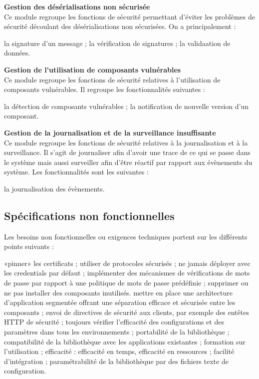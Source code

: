 \textbf{\RIGHTarrow Gestion des désérialisations non sécurisée}\\
Ce module regroupe les fonctions de sécurité permettant d'éviter les problèmes de sécurité découlant des désérialisations non sécurisées. On a principalement :
\begin{itemize}
	\itemcheck la signature d'un message ;
	\itemcheck la vérification de signatures ; 
	\itemcheck la validaation de données.\\
\end{itemize}

\textbf{\RIGHTarrow Gestion de l'utilisation de composants vulnérables}\\
Ce module regroupe les fonctions de sécurité relatives à l'utilisation de composants vulnérables. Il regroupe les fonctionnalités suivantes :
\begin{itemize}
	\itemcheck la détection de composants vulnérables ;
	\itemcheck la notification de nouvelle version d'un composant.\\
\end{itemize}

\textbf{\RIGHTarrow Gestion de la journalisation et de la surveillance insuffisante}\\
Ce module regroupe les fonctions de sécurité relatives à la journalisation et à la surveillance. Il s'agit de journaliser afin d'avoir une trace de ce qui se passe dans le système mais aussi surveiller afin d'être réactif par rapport aux évènements du système. Les fonctionnalités sont les suivantes :
\begin{itemize}
	\itemcheck la journalisation des évènements.
\end{itemize}

\subsection{Spécifications non fonctionnelles}
Les besoins non fonctionnelles ou exigences techniques portent sur les différents points suivants :
\begin{itemize}
	\itemcheck «pinner» les certificats ; 
	\itemcheck utiliser de protocoles sécurisés ;
	\itemcheck ne jamais déployer avec les credentials par défaut ;
	\itemcheck implémenter des mécanismes de vérifications de mots de passe par rapport à une politique de mots de passe prédéfinie ;
	\itemcheck supprimer ou ne pas installer des composants inutilisés.
	\itemcheck mettre en place une architecture d'application segmentée offrant une séparation efficace et sécurisée entre les composants ;
	\itemcheck envoi de directives de sécurité aux clients, par exemple des entêtes HTTP de sécurité ;
	\itemcheck toujours vérifier l'efficacité des configurations et des paramètres dans tous les environnements ;
	\itemcheck portabilité de la bibliothèque ;
	\itemcheck compatibilité de la bibliothèque avec les applications existantes ;
	\itemcheck formation sur l'utilisation ;
	\itemcheck efficacité : efficacité en temps, efficacité en ressources ;
	\itemcheck facilité d'intégration ;
	\itemcheck paramétrabilité de la bibliothèque par des fichiers texte de configuration.
\end{itemize}

